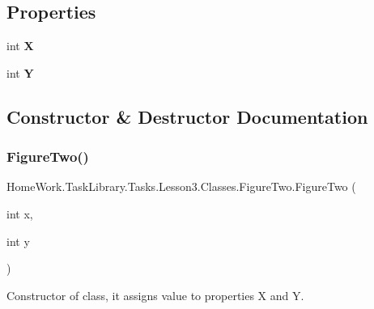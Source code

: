 \subsection*{Properties}
\begin{DoxyCompactItemize}
\item 
\mbox{\label{class_home_work_1_1_task_library_1_1_tasks_1_1_lesson3_1_1_classes_1_1_figure_two_a4aef6d3675b2d703e2c80ac1f6d91744}} 
int {\bfseries X}
\item 
\mbox{\label{class_home_work_1_1_task_library_1_1_tasks_1_1_lesson3_1_1_classes_1_1_figure_two_a4050930a7e829478e9cbe1a755d050dd}} 
int {\bfseries Y}
\end{DoxyCompactItemize}


\subsection{Constructor \& Destructor Documentation}
\mbox{\label{class_home_work_1_1_task_library_1_1_tasks_1_1_lesson3_1_1_classes_1_1_figure_two_ac96e014761ba3f5646c19408d9c03b6e}} 
\subsubsection{\texorpdfstring{FigureTwo()}{FigureTwo()}}
{\footnotesize\ttfamily Home\+Work.\+Task\+Library.\+Tasks.\+Lesson3.\+Classes.\+Figure\+Two.\+Figure\+Two (\begin{DoxyParamCaption}\item[{int}]{x,  }\item[{int}]{y }\end{DoxyParamCaption})}



Constructor of class, it assigns value to properties X and Y. 


